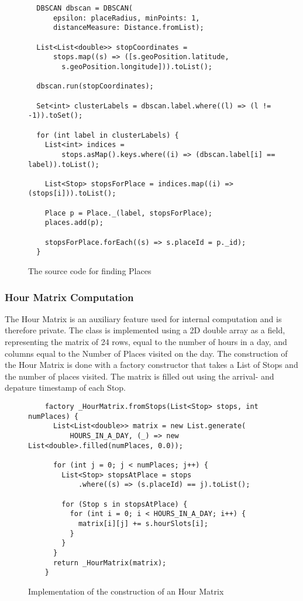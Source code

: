 \begin{figure}[h]
    \centering
   \begin{verbatim}
  DBSCAN dbscan = DBSCAN(
      epsilon: placeRadius, minPoints: 1, 
      distanceMeasure: Distance.fromList);
  
  List<List<double>> stopCoordinates =
      stops.map((s) => ([s.geoPosition.latitude, 
        s.geoPosition.longitude])).toList();

  dbscan.run(stopCoordinates);

  Set<int> clusterLabels = dbscan.label.where((l) => (l != -1)).toSet();

  for (int label in clusterLabels) {
    List<int> indices =
        stops.asMap().keys.where((i) => (dbscan.label[i] == label)).toList();

    List<Stop> stopsForPlace = indices.map((i) => (stops[i])).toList();

    Place p = Place._(label, stopsForPlace);
    places.add(p);

    stopsForPlace.forEach((s) => s.placeId = p._id);
  }
\end{verbatim}
    \caption{The source code for finding Places}
    \label{fig:source-code-places}
\end{figure}


\subsubsection*{Hour Matrix Computation}
The Hour Matrix is an auxiliary feature used for internal computation and is therefore private. The class is implemented using a 2D double array as a field, representing the matrix of 24 rows, equal to the number of hours in a day, and columns equal to the Number of Places visited on the day. The construction of the Hour Matrix is done with a factory constructor that takes a List of Stops and the number of places visited. The matrix is filled out using the arrival- and depature timestamp of each Stop.

\begin{figure}[h]
    \centering
    \begin{verbatim}
    factory _HourMatrix.fromStops(List<Stop> stops, int numPlaces) {
      List<List<double>> matrix = new List.generate(
          HOURS_IN_A_DAY, (_) => new List<double>.filled(numPlaces, 0.0));
    
      for (int j = 0; j < numPlaces; j++) {
        List<Stop> stopsAtPlace = stops
            .where((s) => (s.placeId) == j).toList();
    
        for (Stop s in stopsAtPlace) {
          for (int i = 0; i < HOURS_IN_A_DAY; i++) {
            matrix[i][j] += s.hourSlots[i];
          }
        }
      }
      return _HourMatrix(matrix);
    }
    \end{verbatim}
    \caption{Implementation of the construction of an Hour Matrix}
    \label{fig:hour-matrix-construction}
\end{figure}

